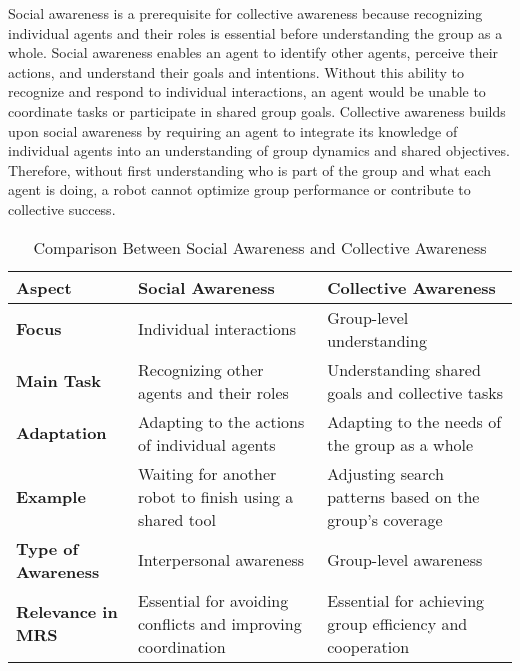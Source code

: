 Social awareness is a prerequisite for collective awareness because recognizing individual agents and their roles is essential before understanding the group as a whole. Social awareness enables an agent to identify other agents, perceive their actions, and understand their goals and intentions. Without this ability to recognize and respond to individual interactions, an agent would be unable to coordinate tasks or participate in shared group goals. Collective awareness builds upon social awareness by requiring an agent to integrate its knowledge of individual agents into an understanding of group dynamics and shared objectives. Therefore, without first understanding who is part of the group and what each agent is doing, a robot cannot optimize group performance or contribute to collective success. 
\begin{table}[h!]
    \centering
    \begin{tabular}{|l|l|l|}
        \hline
        \textbf{Aspect}            & \textbf{Social Awareness}                                   & \textbf{Collective Awareness}                            \\ \hline
        \textbf{Focus}             & Individual interactions                                     & Group-level understanding                                \\ \hline
        \textbf{Main Task}         & Recognizing other agents and their roles                    & Understanding shared goals and collective tasks          \\ \hline
        \textbf{Adaptation}        & Adapting to the actions of individual agents                & Adapting to the needs of the group as a whole            \\ \hline
        \textbf{Example}           & Waiting for another robot to finish using a shared tool     & Adjusting search patterns based on the group’s coverage  \\ \hline
        \textbf{Type of Awareness} & Interpersonal awareness                                     & Group-level awareness                                    \\ \hline
        \textbf{Relevance in MRS}  & Essential for avoiding conflicts and improving coordination     & Essential for achieving group efficiency and cooperation         \\ \hline
    \end{tabular}
    \caption{Comparison Between Social Awareness and Collective Awareness}
\end{table}


